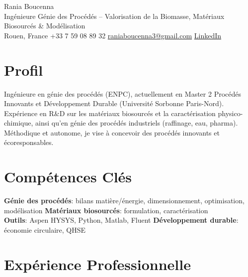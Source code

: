 \documentclass[10pt,a4paper]{article}
\begin{document}
{\latoblack\fontsize{26}{28}\selectfont\color{accent}Rania Boucenna}\\[1pt]
{\small\color{subtext}Ingénieure Génie des Procédés -- Valorisation de la Biomasse, Matériaux Biosourcés \& Modélisation}\\[3pt]
{\small Rouen, France \;\textbullet\; +33 7 59 08 89 32 \;\textbullet\; \href{mailto:raniaboucenna3@gmail.com}{raniaboucenna3@gmail.com} \;\textbullet\; \href{https://www.linkedin.com/in/raniaboucenna}{LinkedIn}}

\vspace{2pt}

\section*{Profil}
{\small Ingénieure en génie des procédés (ENPC), actuellement en Master 2 Procédés Innovants et Développement Durable (Université Sorbonne Paris-Nord). Expérience en R\&D sur les matériaux biosourcés et la caractérisation physico-chimique, ainsi qu'en génie des procédés industriels (raffinage, eau, pharma). Méthodique et autonome, je vise à concevoir des procédés innovants et écoresponsables.}

\section*{Compétences Clés}
{\small
\textbf{Génie des procédés}: bilans matière/énergie, dimensionnement, optimisation, modélisation \quad\textbullet\quad \textbf{Matériaux biosourcés}: formulation, caractérisation\\
\textbf{Outils}: Aspen HYSYS, Python, Matlab, Fluent \quad\textbullet\quad \textbf{Développement durable}: économie circulaire, QHSE
}

\section*{Expérience Professionnelle}
\end{document}
